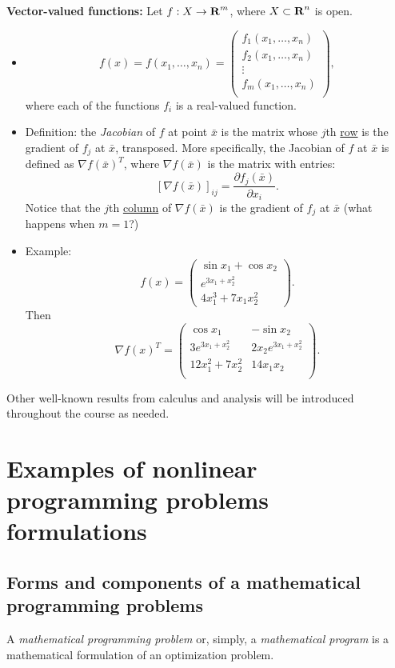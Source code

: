\documentclass[11pt]{article}
\begin{document}
\textbf{Vector-valued functions:} Let $f:X\rightarrow{\mbox{\textbf{R}}}^m$, where $X\subset{\mbox{\textbf{R}}}^n$ is open.
\begin{itemize}
\item
$$
f(x)=f(x_1,\ldots,x_n)=\left(\begin{array}{c}
f_1(x_1,\ldots,x_n)\\
f_2(x_1,\ldots,x_n)\\
\vdots\\
f_m(x_1,\ldots,x_n)\\
\end{array}\right),
$$
where each of the functions $f_i$ is a real-valued function.
\item Definition: the \emph{Jacobian} of $f$ at point $\bar x$ is the matrix whose $j$th \underline{row} is the gradient of $f_j$ at $\bar x$, transposed. More specifically, the Jacobian of $f$ at $\bar x$ is defined as $\nabla f(\bar x)^T$, where $\nabla f(\bar x)$ is the matrix with entries:
$$
[\nabla f(\bar x)]_{ij}=\frac{\partial f_j(\bar x)}{\partial x_i}.
$$
Notice that the $j$th \underline{column} of $\nabla f(\bar x)$ is the gradient of $f_j$ at $\bar x$ (what happens when $m=1$?)
\item Example:
$$
f(x)=\left(
\begin{array}{c}
\sin x_1+\cos x_2\\
e^{3x_1+x_2^2}\\
4x_1^3+7x_1x_2^2
\end{array}
\right).
$$
Then
$$
\nabla f(x)^T=\left(\begin{array}{cc}
\cos x_1&-\sin x_2\\
3e^{3x_1+x_2^2}&2x_2e^{3x_1+x_2^2}\\
12x_1^2+7x_2^2&14x_1x_2\\
\end{array}\right).
$$
\end{itemize}
Other well-known results from calculus and analysis will be introduced throughout the course as needed.

\newpage
\section{Examples of nonlinear programming problems formulations}
\subsection{Forms and components of a mathematical programming  problems}

A \emph{mathematical programming problem} or, simply, a \emph{mathematical program}  is a mathematical formulation of an optimization problem.
\end{document}
